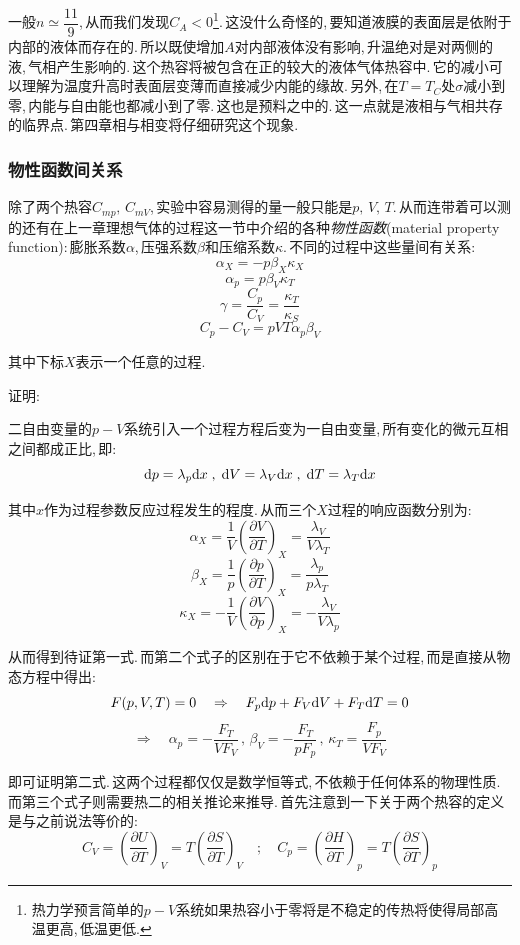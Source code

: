 一般$n\simeq \dfrac{11}{9}$,\,从而我们发现$C_A<0$\footnote{热力学预言简单的$p-V$系统如果热容小于零将是不稳定的\ca 传热将使得局部高温更高,\,低温更低.}.\,这没什么奇怪的,\,要知道液膜的表面层是依附于内部的液体而存在的.\,所以既使增加$A$对内部液体没有影响,\,升温绝对是对两侧的液,\,气相产生影响的.\,这个热容将被包含在正的较大的液体气体热容中.\,它的减小可以理解为温度升高时表面层变薄而直接减少内能的缘故.\,另外,\,在$T=T_C$处$\sigma$减小到零,\,内能与自由能也都减小到了零.\,这也是预料之中的.\,这一点就是液相与气相共存的临界点.\,第四章相与相变将仔细研究这个现象.

\vspace{0.5cm}
\subsubsection{\hei 物性函数间关系}
除了两个热容$C_{mp},\,C_{mV}$,\,实验中容易测得的量一般只能是$p,\,V,\,T$.\,从而连带着可以测的还有在上一章理想气体的过程这一节中介绍的各种\emph{物性函数}(material property function):\,膨胀系数$\alpha$,\,压强系数$\beta$和压缩系数$\kappa$.\,不同的过程中这些量间有关系:
\[\alpha_X=-p\beta_X\kappa_X\]
\[\alpha_p=p\beta_V\kappa_T\]
\[\gamma=\frac{C_{p}}{C_{V}}=\frac{\kappa_T}{\kappa_S}\]
\[C_{p}-C_{V}=pVT\alpha_p\beta_V\]

其中下标$X$表示一个任意的过程.

\vspace{0.3cm}
{\hei 证明:}

二自由变量的$p-V$系统引入一个过程方程后变为一自由变量,\,所有变化的微元互相之间都成正比,\,即:
\[\textrm{d} p=\lambda_p \textrm{d} x\; , \; \textrm{d} V=\lambda_V \textrm{d} x\; , \; \textrm{d} T=\lambda_T \textrm{d} x\]

其中$x$作为过程参数反应过程发生的程度.\,从而三个$X$过程的响应函数分别为:
\[\alpha_X=\frac{1}{V}\left(\frac{\partial V}{\partial T}\right)_X=\frac{\lambda_V}{V\lambda_T}\]
\[\beta_X=\frac{1}{p}\left(\frac{\partial p}{\partial T}\right)_X=\frac{\lambda_p}{p\lambda_T}\]
\[\kappa_X=-\frac{1}{V}\left(\frac{\partial V}{\partial p}\right)_X=-\frac{\lambda_V}{V\lambda_p}\]

从而得到待证第一式.\,而第二个式子的区别在于它不依赖于某个过程,\,而是直接从物态方程中得出:
\[F(p,V,T)=0\quad \Rightarrow \quad F_p\textrm{d} p +F_V \textrm{d} V +F_T \textrm{d} T=0\]
\[\Rightarrow \quad \alpha_p=-\frac{F_T}{VF_V}\, , \, \beta_V=-\frac{F_T}{pF_p}\, , \, \kappa_T=\frac{F_p}{VF_V}\]

即可证明第二式.\,这两个过程都仅仅是数学恒等式,\,不依赖于任何体系的物理性质.\,而第三个式子则需要热二的相关推论来推导.\,首先注意到一下关于两个热容的定义是与之前说法等价的:
\[C_{V}=\left(\frac{\partial U}{\partial T}\right)_V=T\left(\frac{\partial S}{\partial T}\right)_V\quad ;\quad C_{p}=\left(\frac{\partial H}{\partial T}\right)_p=T\left(\frac{\partial S}{\partial T}\right)_p\]

